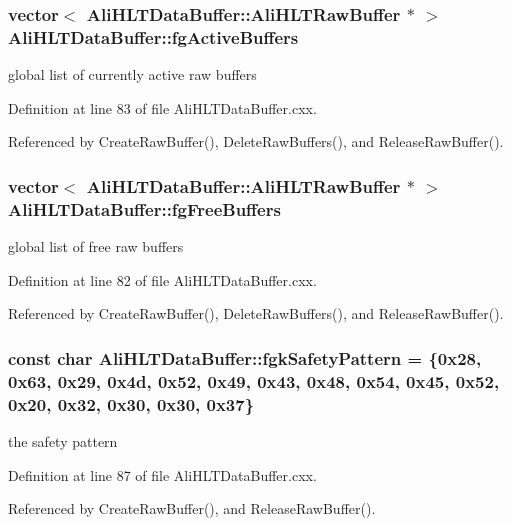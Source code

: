 \subsubsection{\setlength{\rightskip}{0pt plus 5cm}vector$<$ {\bf Ali\-HLTData\-Buffer::Ali\-HLTRaw\-Buffer} $\ast$ $>$ {\bf Ali\-HLTData\-Buffer::fg\-Active\-Buffers}\hspace{0.3cm}{\tt  [static, private]}}\label{classAliHLTDataBuffer_v2}


global list of currently active raw buffers 

Definition at line 83 of file Ali\-HLTData\-Buffer.cxx.

Referenced by Create\-Raw\-Buffer(), Delete\-Raw\-Buffers(), and Release\-Raw\-Buffer().
\subsubsection{\setlength{\rightskip}{0pt plus 5cm}vector$<$ {\bf Ali\-HLTData\-Buffer::Ali\-HLTRaw\-Buffer} $\ast$ $>$ {\bf Ali\-HLTData\-Buffer::fg\-Free\-Buffers}\hspace{0.3cm}{\tt  [static, private]}}\label{classAliHLTDataBuffer_v1}


global list of free raw buffers 

Definition at line 82 of file Ali\-HLTData\-Buffer.cxx.

Referenced by Create\-Raw\-Buffer(), Delete\-Raw\-Buffers(), and Release\-Raw\-Buffer().
\subsubsection{\setlength{\rightskip}{0pt plus 5cm}const char {\bf Ali\-HLTData\-Buffer::fgk\-Safety\-Pattern} = \{0x28, 0x63, 0x29, 0x4d, 0x52, 0x49, 0x43, 0x48, 0x54, 0x45, 0x52, 0x20, 0x32, 0x30, 0x30, 0x37\}\hspace{0.3cm}{\tt  [static, private]}}\label{classAliHLTDataBuffer_v6}


the safety pattern 

Definition at line 87 of file Ali\-HLTData\-Buffer.cxx.

Referenced by Create\-Raw\-Buffer(), and Release\-Raw\-Buffer().
